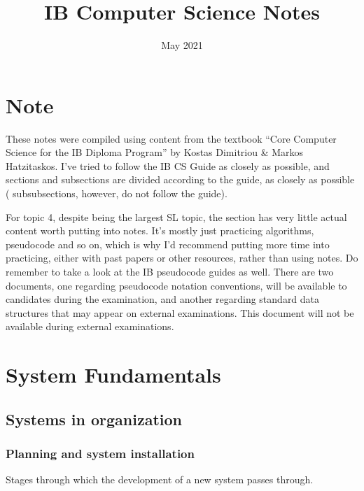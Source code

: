 \documentclass{article}
\title{\Large \textbf{IB Computer Science Notes}}
\author{}
\date{May 2021}
\begin{document}
\begin{titlepage}
\maketitle
\end{titlepage}

\begin{center}
    \tableofcontents
\end{center}

\newpage
\section*{Note}
These notes were compiled using content from the textbook ``Core Computer
Science for the IB Diploma Program'' by Kostas Dimitriou \& Markos Hatzitaskos.
I've tried to follow the IB CS Guide as closely as possible, and sections and
subsections are divided according to the guide, as closely as possible (
subsubsections, however, do not follow the guide).

For topic 4, despite being the largest SL topic, the section has very little
actual content worth putting into notes. It's mostly just practicing
algorithms, pseudocode and so on, which is why I'd recommend putting more time
into practicing, either with past papers or other resources, rather than
using notes. Do remember to take a look at the IB pseudocode guides
as well. There are two documents, one regarding pseudocode notation
conventions, will be available to candidates during the examination,
and another regarding standard data structures that may appear on external
examinations. This document will not be available during external examinations.

\newpage
\section{System Fundamentals}

\subsection{Systems in organization}

\subsubsection{Planning and system installation}

Stages through which the development of a new system passes
through.
\end{document}
